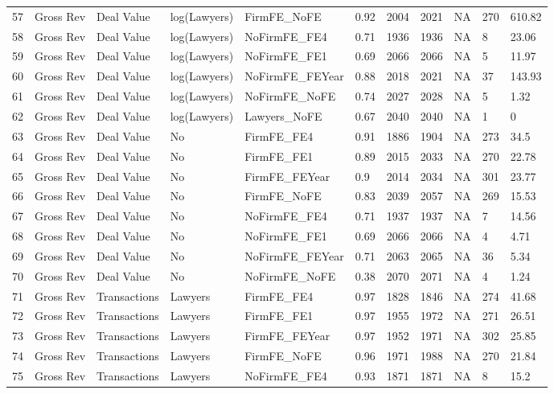 \begin{table}[ht]
\begin{tabular}{rllllllllll}
  57 & Gross Rev & Deal Value & log(Lawyers) & FirmFE\_NoFE & 0.92 & 2004 & 2021 & NA & 270 & 610.82 \\ 
  58 & Gross Rev & Deal Value & log(Lawyers) & NoFirmFE\_FE4 & 0.71 & 1936 & 1936 & NA & 8 & 23.06 \\ 
  59 & Gross Rev & Deal Value & log(Lawyers) & NoFirmFE\_FE1 & 0.69 & 2066 & 2066 & NA & 5 & 11.97 \\ 
  60 & Gross Rev & Deal Value & log(Lawyers) & NoFirmFE\_FEYear & 0.88 & 2018 & 2021 & NA & 37 & 143.93 \\ 
  61 & Gross Rev & Deal Value & log(Lawyers) & NoFirmFE\_NoFE & 0.74 & 2027 & 2028 & NA & 5 & 1.32 \\ 
  62 & Gross Rev & Deal Value & log(Lawyers) & Lawyers\_NoFE & 0.67 & 2040 & 2040 & NA & 1 & 0 \\ 
  63 & Gross Rev & Deal Value & No & FirmFE\_FE4 & 0.91 & 1886 & 1904 & NA & 273 & 34.5 \\ 
  64 & Gross Rev & Deal Value & No & FirmFE\_FE1 & 0.89 & 2015 & 2033 & NA & 270 & 22.78 \\ 
  65 & Gross Rev & Deal Value & No & FirmFE\_FEYear & 0.9 & 2014 & 2034 & NA & 301 & 23.77 \\ 
  66 & Gross Rev & Deal Value & No & FirmFE\_NoFE & 0.83 & 2039 & 2057 & NA & 269 & 15.53 \\ 
  67 & Gross Rev & Deal Value & No & NoFirmFE\_FE4 & 0.71 & 1937 & 1937 & NA & 7 & 14.56 \\ 
  68 & Gross Rev & Deal Value & No & NoFirmFE\_FE1 & 0.69 & 2066 & 2066 & NA & 4 & 4.71 \\ 
  69 & Gross Rev & Deal Value & No & NoFirmFE\_FEYear & 0.71 & 2063 & 2065 & NA & 36 & 5.34 \\ 
  70 & Gross Rev & Deal Value & No & NoFirmFE\_NoFE & 0.38 & 2070 & 2071 & NA & 4 & 1.24 \\ 
  71 & Gross Rev & Transactions & Lawyers & FirmFE\_FE4 & 0.97 & 1828 & 1846 & NA & 274 & 41.68 \\ 
  72 & Gross Rev & Transactions & Lawyers & FirmFE\_FE1 & 0.97 & 1955 & 1972 & NA & 271 & 26.51 \\ 
  73 & Gross Rev & Transactions & Lawyers & FirmFE\_FEYear & 0.97 & 1952 & 1971 & NA & 302 & 25.85 \\ 
  74 & Gross Rev & Transactions & Lawyers & FirmFE\_NoFE & 0.96 & 1971 & 1988 & NA & 270 & 21.84 \\ 
  75 & Gross Rev & Transactions & Lawyers & NoFirmFE\_FE4 & 0.93 & 1871 & 1871 & NA & 8 & 15.2 \\ 

\end{tabular}
\end{table}
